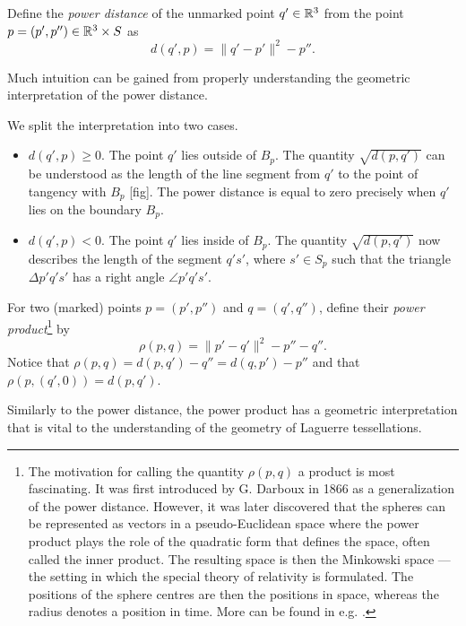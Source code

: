 \begin{definition}
	Define the \textit{power distance} of the unmarked point $q'\in {\mathbb R^3}$ from the point $p=(p',p'')\in{\mathbb R^3}\times S$ as
	$$d(q',p) = \|q'-p'\|^2 - p''.$$
\end{definition}
Much intuition can be gained from properly understanding the geometric interpretation of the power distance.

\begin{remark}
	We split the interpretation into two cases. 
\begin{itemize}
	\item $d(q',p) \geq 0$. The point $q'$ lies outside of $B_p$. The quantity $\sqrt{d(p,q')}$ can be understood as the length of the line segment from $q'$ to the point of tangency with $B_p$ [fig]. The power distance is equal to zero precisely when $q'$ lies on the boundary $B_p$.
	\item $d(q',p) < 0$. The point $q'$ lies inside of $B_p$. The quantity $\sqrt{d(p,q')}$ now describes the length of the segment $q's'$, where $s' \in S_p$ such that the triangle $\Delta p'q's'$ has a right angle $\angle p'q's'$. 
\end{itemize}
\end{remark}

\begin{definition}
	For two (marked) points $p=(p',p'')$ and $q=(q',q'')$, define their \textit{power product}\footnote{ The motivation for calling the quantity $\rho(p,q)$ a product is most fascinating. It was first introduced by G. Darboux in 1866 as a generalization of the power distance. However, it was later discovered that the spheres can be represented as vectors in a pseudo-Euclidean space where the power product plays the role of the quadratic form that defines the space, often called the inner product. The resulting space is then the Minkowski space --- the setting in which the special theory of relativity is formulated. The positions of the sphere centres are then the positions in space, whereas the radius denotes a position in time. More can be found in e.g. \cite{Kocik2007}.} by 
$$\rho(p,q) = \|p'-q'\|^2 - p'' - q''.$$
Notice that $\rho(p,q) = d(p,q') - q'' = d(q,p') - p''$ and that $\rho(p,(q',0)) = d(p,q')$.
\end{definition}

Similarly to the power distance, the power product has a geometric interpretation that is vital to the understanding of the geometry of Laguerre tessellations.

